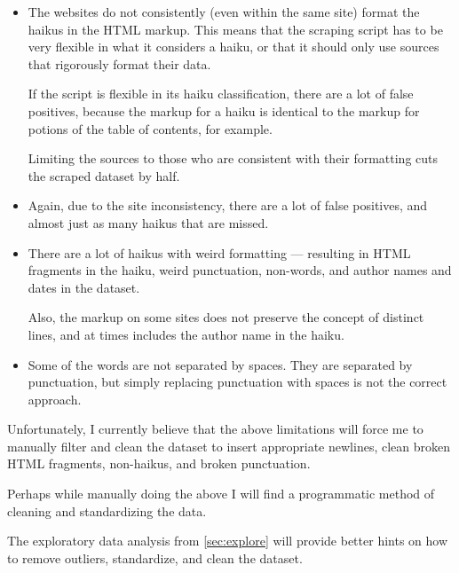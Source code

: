 \begin{itemize}
      \item The websites do not consistently (even within the same site) format the haikus in the HTML markup.
            This means that the scraping script has to be very flexible in what it considers a haiku, or that it should only use sources that rigorously format their data.

            If the script is flexible in its haiku classification, there are a lot of false positives, because the markup for a haiku is identical to the markup for potions of the table of contents, for example.

            Limiting the sources to those who are consistent with their formatting cuts the scraped dataset by half.
      \item Again, due to the site inconsistency, there are a lot of false positives, and almost just as many haikus that are missed.
      \item There are a lot of haikus with weird formatting --- resulting in HTML fragments in the haiku, weird punctuation, non-words, and author names and dates in the dataset.

            Also, the markup on some sites does not preserve the concept of distinct lines, and at times includes the author name in the haiku.
      \item Some of the words are not separated by spaces. They are separated by punctuation, but simply replacing punctuation with spaces is not the correct approach.
\end{itemize}

Unfortunately, I currently believe that the above limitations will force me to manually filter and clean the dataset to insert appropriate newlines, clean broken HTML fragments, non-haikus, and broken punctuation.

Perhaps while manually doing the above I will find a programmatic method of cleaning and standardizing the data.

The exploratory data analysis from \autoref{sec:explore} will provide better hints on how to remove outliers, standardize, and clean the dataset.

